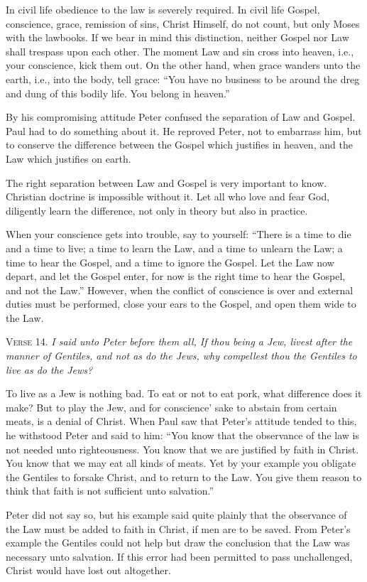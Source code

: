 In civil life obedience to the law is severely required. In civil life Gospel, conscience, grace, remission of sins, Christ Himself, do not count, but only Moses with the lawbooks. If we bear in mind this distinction, neither Gospel nor Law shall trespass upon each other. The moment Law and sin cross into heaven, i.e., your conscience, kick them out. On the other hand, when grace wanders unto the earth, i.e., into the body, tell grace: “You have no business to be around the dreg and dung of this bodily life. You belong in heaven.”

By his compromising attitude Peter confused the separation of Law and Gospel. Paul had to do something about it. He reproved Peter, not to embarrass him, but to conserve the difference between the Gospel which justifies in heaven, and the Law which justifies on earth.

The right separation between Law and Gospel is very important to know. Christian doctrine is impossible without it. Let all who love and fear God, diligently learn the difference, not only in theory but also in practice.

When your conscience gets into trouble, say to yourself: “There is a time to die and a time to live; a time to learn the Law, and a time to unlearn the Law; a time to hear the Gospel, and a time to ignore the Gospel. Let the Law now depart, and let the Gospel enter, for now is the right time to hear the Gospel, and not the Law.” However, when the conflict of conscience is over and external duties must be performed, close your ears to the Gospel, and open them wide to the Law.

\textsc{Verse} 14. \emph{I said unto Peter before them all, If thou being a Jew, livest after the manner of Gentiles, and not as do the Jews, why compellest thou the Gentiles to live as do the Jews?}

To live as a Jew is nothing bad. To eat or not to eat pork, what difference does it make? But to play the Jew, and for conscience’ sake to abstain from certain meats, is a denial of Christ. When Paul saw that Peter’s attitude tended to this, he withstood Peter and said to him: “You know that the observance of the law is not needed unto righteousness. You know that we are justified by faith in Christ. You know that we may eat all kinds of meats. Yet by your example you obligate the Gentiles to forsake Christ, and to return to the Law. You give them reason to think that faith is not sufficient unto salvation.”

Peter did not say so, but his example said quite plainly that the observance of the Law must be added to faith in Christ, if men are to be saved. From Peter’s example the Gentiles could not help but draw the conclusion that the Law was necessary unto salvation. If this error had been permitted to pass unchallenged, Christ would have lost out altogether.


